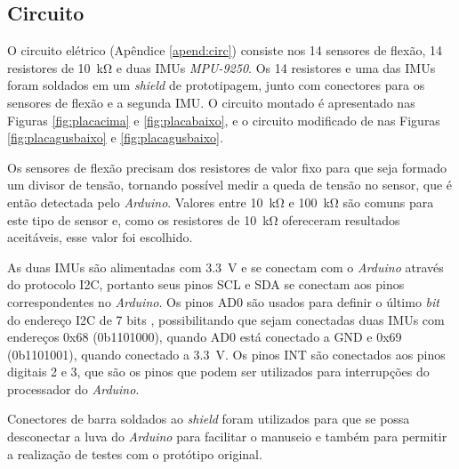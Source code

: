 \subsection{Circuito} %
\label{sub:met_circuito}
O circuito elétrico (Apêndice \ref{apend:circ}) consiste nos 14 sensores de flexão, 14 resistores de \SI{10}{\kilo\ohm} e duas \ac{IMU}s \textit{MPU-9250}. Os 14 resistores e uma das \ac{IMU}s foram soldados em um \textit{shield} de prototipagem, junto com conectores para os sensores de flexão e a segunda \ac{IMU}. O circuito montado é apresentado nas Figuras \ref{fig:placacima} e \ref{fig:placabaixo}, e o circuito modificado de  nas Figuras \ref{fig:placagusbaixo} e \ref{fig:placagusbaixo}.

Os sensores de flexão precisam dos resistores de valor fixo para que seja formado um divisor de tensão, tornando possível medir a queda de tensão no sensor, que é então detectada pelo \textit{Arduino}. Valores entre \SI{10}{\kilo\ohm} e \SI{100}{\kilo\ohm} são comuns para este tipo de sensor \cite{sparkflex} e, como os resistores de \SI{10}{\kilo\ohm} ofereceram resultados aceitáveis, esse valor foi escolhido.

As duas \ac{IMU}s são alimentadas com \SI{3.3}{\volt} e se conectam com o \textit{Arduino} através do protocolo \ac{I2C}, portanto seus pinos \ac{SCL} e \ac{SDA} se conectam aos pinos correspondentes no \textit{Arduino}. Os pinos AD0 são usados para definir o último \textit{bit} do endereço \ac{I2C} de 7 bits \cite{specmpu9250}, possibilitando que sejam conectadas duas \ac{IMU}s com endereços 0x68 (0b1101000), quando AD0 está conectado a \ac{GND} e 0x69 (0b1101001), quando conectado a \SI{3.3}{\volt}. Os pinos \ac{INT} são conectados aos pinos digitais 2 e 3, que são os pinos que podem ser utilizados para interrupções do processador do \textit{Arduino}.

Conectores de barra soldados ao \textit{shield} foram utilizados para que se possa desconectar a luva do \textit{Arduino} para facilitar o manuseio e também para permitir a realização de testes com o protótipo original.

